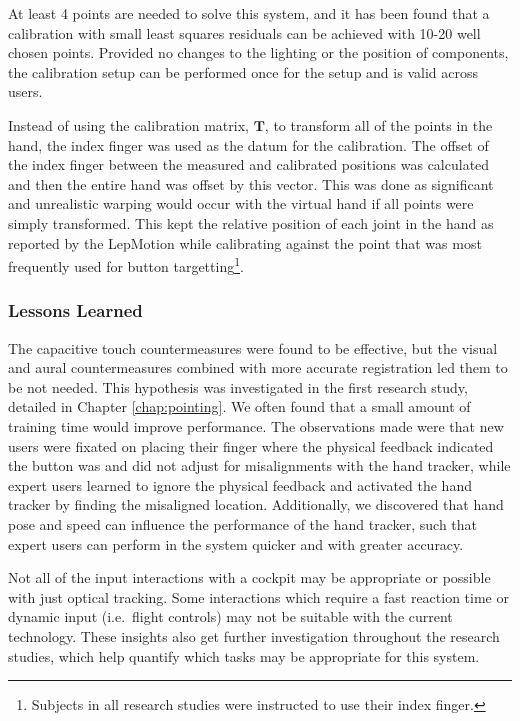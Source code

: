 At least 4 points are needed to solve this system, and it has been found that a calibration with small least squares residuals can be achieved with 10-20 well chosen points.
Provided no changes to the lighting or the position of components, the calibration setup can be performed once for the setup and is valid across users.

Instead of using the calibration matrix, $\mathbf{T}$, to transform all of the points in the hand, the index finger was used as the datum for the calibration.
The offset of the index finger between the measured and calibrated positions was calculated and then the entire hand was offset by this vector.
This was done as significant and unrealistic warping would occur with the virtual hand if all points were simply transformed.
This kept the relative position of each joint in the hand as reported by the LepMotion while calibrating against the point that was most frequently used for button targetting\footnote{Subjects in all research studies were instructed to use their index finger.}.

\subsubsection{Lessons Learned}

The capacitive touch countermeasures were found to be effective, but the visual and aural countermeasures combined with more accurate registration led them to be not needed.
This hypothesis was investigated in the first research study, detailed in Chapter \ref{chap:pointing}.
We often found that a small amount of training time would improve performance.
The observations made were that new users were fixated on placing their finger where the physical feedback indicated the button was and did not adjust for misalignments with the hand tracker, while expert users learned to ignore the physical feedback and activated the hand tracker by finding the misaligned location.
Additionally, we discovered that hand pose and speed can influence the performance of the hand tracker, such that expert users can perform in the system quicker and with greater accuracy.

Not all of the input interactions with a cockpit may be appropriate or possible with just optical tracking.
Some interactions which require a fast reaction time or dynamic input (i.e.\ flight controls) may not be suitable with the current technology.
These insights also get further investigation throughout the research studies, which help quantify which tasks may be appropriate for this system.

